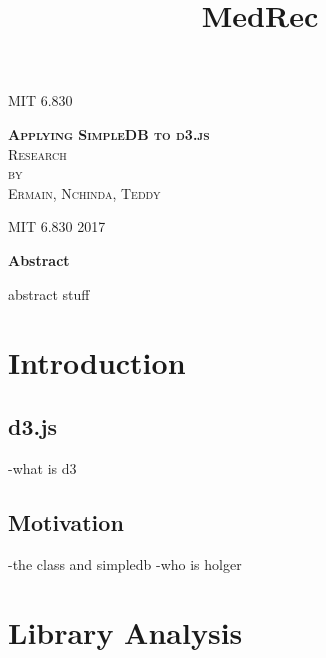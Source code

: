 \documentclass[a4paper]{article}
\begin{document}
\title{MedRec}

\begin{titlepage}
\begin{center}

\textsc{\Large MIT 6.830}\\[4em]

\vspace{4em}

\textsc{\huge \textbf{Applying SimpleDB to d3.js}}\\[4em]

\textsc{\large Research}\\[1em]

\textsc{by}\\[1em]

\textsc{\Large Ermain, Nchinda, Teddy}\\[1em]

\end{center}

\vspace*{\fill}
\textsc{MIT 6.830\hspace*{\fill} 2017}

\end{titlepage}
\begin{center}
{\large\bf{Abstract\\}}
\end{center}
abstract stuff
\tableofcontents\label{c}
\newpage


\section{Introduction} \label{overview}%
\subsection{d3.js}
-what is d3
\subsection{Motivation}
-the class and simpledb
-who is holger
\section{Library Analysis}
\end{document}
